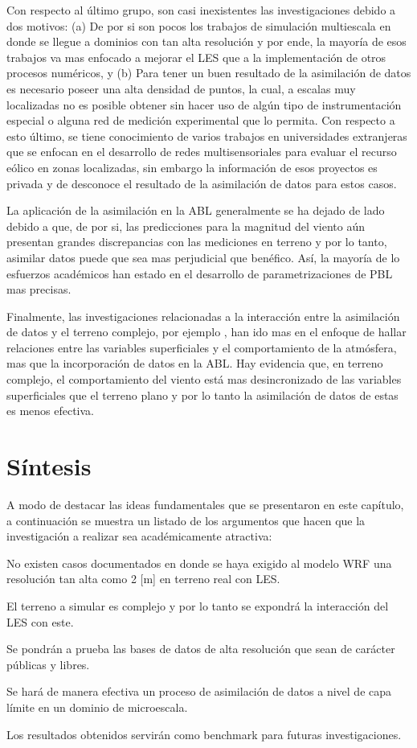 Con respecto al último grupo, son casi inexistentes las investigaciones debido a dos motivos: (a) De por si son pocos los trabajos de simulación multiescala en donde se llegue a dominios con tan alta resolución y por ende, la mayoría de esos trabajos va mas enfocado a mejorar el LES que a la implementación de otros procesos numéricos, y (b) Para tener un buen resultado de la asimilación de datos es necesario poseer una alta densidad de puntos, la cual, a escalas muy localizadas no es posible obtener sin hacer uso de algún tipo de instrumentación especial o alguna red de medición experimental que lo permita. Con respecto a esto último, se tiene conocimiento de varios trabajos en universidades extranjeras que se enfocan en el desarrollo de redes multisensoriales para evaluar el recurso eólico en zonas localizadas, sin embargo la información de esos proyectos es privada y de desconoce el resultado de la asimilación de datos para estos casos.

La aplicación de la asimilación en la ABL generalmente se ha dejado de lado debido a que, de por si, las predicciones para la magnitud del viento aún presentan grandes discrepancias con las mediciones en terreno y por lo tanto, asimilar datos puede que sea mas perjudicial que benéfico. Así, la mayoría de lo esfuerzos académicos han estado en el desarrollo de parametrizaciones de PBL mas precisas. 

Finalmente, las investigaciones relacionadas a la interacción entre la asimilación de datos y el terreno complejo, por ejemplo  \cite{hacker2018challenges}, han ido mas en el enfoque de hallar relaciones entre las variables superficiales y el comportamiento de la atmósfera, mas que la incorporación de datos en la ABL. Hay evidencia que, en terreno complejo, el comportamiento del viento está mas desincronizado de las variables superficiales que el terreno plano y por lo tanto la asimilación de datos de estas es menos efectiva.
\newpage
\section{Síntesis}
A modo de destacar las ideas fundamentales que se presentaron en este capítulo, a continuación se muestra un listado de los argumentos que hacen que la investigación a realizar sea académicamente atractiva:
\begin{enumerate*}
	\item No existen casos documentados en donde se haya exigido al modelo WRF una resolución tan alta como 2 [m] en terreno real con LES.
	\item El terreno a simular es complejo y por lo tanto se expondrá la interacción del LES con este.
	\item Se pondrán a prueba las bases de datos de alta resolución que sean de carácter públicas y libres.
	\item Se hará de manera efectiva un proceso de asimilación de datos a nivel de capa límite en un dominio de microescala.
	\item Los resultados obtenidos servirán como benchmark para futuras investigaciones.
\end{enumerate*}

